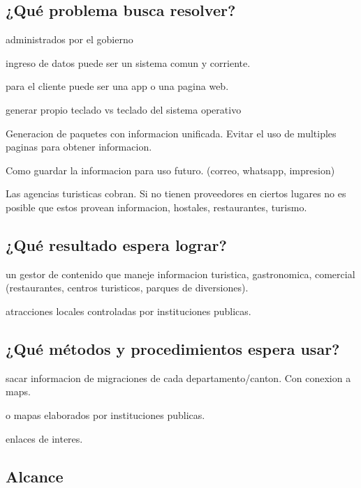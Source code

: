 \documentclass{article}
\begin{document}
\subsection{¿Qué problema busca resolver?}

administrados por el gobierno

ingreso de datos puede ser un sistema comun y corriente.

para el cliente puede ser una app o una pagina web.

generar propio teclado vs teclado del sistema operativo

Generacion de paquetes con informacion unificada. Evitar el uso de multiples
paginas para obtener informacion.

Como guardar la informacion para uso futuro. (correo, whatsapp, impresion)

Las agencias turisticas cobran. Si no tienen proveedores en ciertos lugares no
es posible que estos provean informacion, hostales, restaurantes, turismo.

\subsection{¿Qué resultado espera lograr?}

un gestor de contenido que maneje informacion turistica, gastronomica, comercial
(restaurantes, centros turisticos, parques de diversiones).

atracciones locales controladas por instituciones publicas.

\subsection{¿Qué métodos y procedimientos espera usar?}

sacar informacion de migraciones de cada departamento/canton. Con conexion a maps.

o mapas elaborados por instituciones publicas.

enlaces de interes.

\subsection{Alcance}
\end{document}
